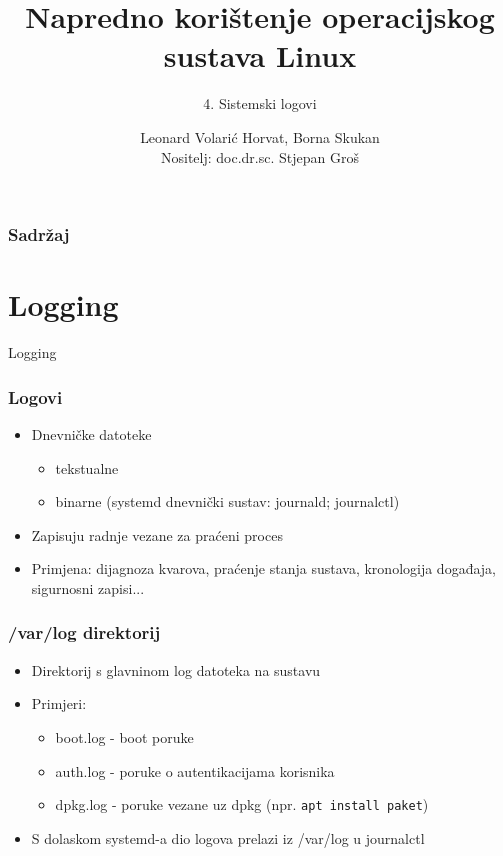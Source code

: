 \documentclass[t,table,usenames,dvipsnames]{beamer}
\date{\todayiso}
\title[NKOSL]{Napredno korištenje operacijskog sustava Linux}
\author[Leonard Volarić Horvat, Borna Skukan]{Leonard Volarić Horvat, Borna Skukan\\{\small Nositelj: doc.dr.sc. Stjepan Groš}}
\subtitle{4. Sistemski logovi}
\institute[FER]{Sveučilište u Zagrebu\\Fakultet elektrotehnike i računarstva}
\newcommand{\shell}[1]{\texttt{#1}}
\begin{document}
{
	\begin{frame}
		\maketitle
	\end{frame}
}

\begin{frame}
    \frametitle{Sadržaj}
    \tableofcontents
\end{frame}

\section{Logging}

\begin{frame}
    \vspace*{\fill}
        \begin{center}
            \Huge{Logging}
        \end{center}
    \vspace*{\fill}
\end{frame}


\begin{frame}
    \frametitle{Logovi}
    \begin{itemize}
        \item Dnevničke datoteke 
        \begin{itemize}
            \item tekstualne
            \item binarne (systemd dnevnički sustav: journald; journalctl)
        \end{itemize}
        \item Zapisuju radnje vezane za praćeni proces
        \item Primjena: dijagnoza kvarova, praćenje stanja sustava, kronologija događaja, sigurnosni zapisi...
    \end{itemize}
\end{frame}



\begin{frame}
    \frametitle{/var/log direktorij}
    \begin{itemize}
        \item Direktorij s glavninom log datoteka na sustavu
        \item Primjeri:
        \begin{itemize}
            \item boot.log - boot poruke
            \item auth.log - poruke o autentikacijama korisnika
            \item dpkg.log - poruke vezane uz dpkg (npr. \shell{apt install paket})
        \end{itemize}
        \item S dolaskom systemd-a dio logova prelazi iz /var/log u journalctl
    \end{itemize}
\end{frame}
\end{document}
